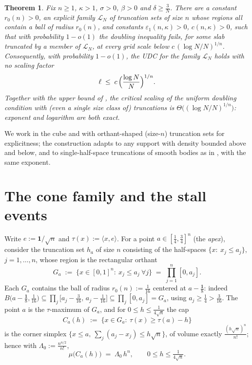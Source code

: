 \documentclass[11pt]{article}
\newtheorem{theorem}{Theorem}[section]
\begin{document}
\begin{theorem}\label{thm:main}
Fix $n\ge1$, $\kappa>1$, $\sigma>0$, $\beta>0$ and $\delta\ge\frac3N$.  There
are a constant $r_0(n)>0$, an explicit family
$\mathcal L_N$ of truncation sets of size $n$ whose regions all contain a ball
of radius $r_0(n)$, and constants
$\varepsilon_1(n,\kappa)>0$, $c(n,\kappa)>0$, such that with probability
$1-o(1)$ the doubling inequality fails, for some slab truncated by a member of
$\mathcal L_N$, at every grid scale below
$c\,(\log N/N)^{1/n}$.  Consequently, with probability $1-o(1)$, the UDC for
the family $\mathcal L_N$ holds with no scaling factor
\[
\ell\;\le\;c\,\Bigl(\frac{\log N}{N}\Bigr)^{1/n} .
\]
Together with the upper bound of \cite{companion2}, the critical scaling of
the uniform doubling condition with (even a single size class of) truncations
is $\Theta\bigl((\log N/N)^{1/n}\bigr)$: exponent and logarithm are both
exact.
\end{theorem}

We work in the cube and with orthant-shaped (size-$n$) truncation sets for
explicitness; the construction adapts to any support with density bounded
above and below, and to single-half-space truncations of smooth bodies as in
\cite{companion4}, with the same exponent.

\section{The cone family and the stall events}\label{sec:cones}

Write $e:=\mathbf 1/\sqrt n$ and $\tau(x):=\langle x,e\rangle$.  For a point
$a\in[\tfrac14,\tfrac34]^n$ (the \emph{apex}), consider the truncation set
$h_a$ of size $n$ consisting of the half-spaces
$\{x:\ x_j\le a_j\}$, $j=1,\dots,n$, whose region is the rectangular orthant
\[
G_a\;:=\;\bigl\{x\in[0,1]^n:\ x_j\le a_j\ \forall j\bigr\}
\;=\;\prod_{j=1}^n[0,a_j] .
\]
Each $G_a$ contains the ball of radius $r_0(n):=\frac1{16}$ centered at
$a-\frac{\mathbf 1}{8}$: indeed
$B\bigl(a-\tfrac{\mathbf1}8,\tfrac1{16}\bigr)\subseteq
\prod_j\bigl[a_j-\tfrac3{16},\,a_j-\tfrac1{16}\bigr]\subseteq\prod_j[0,a_j]=G_a$,
using $a_j\ge\tfrac14>\tfrac3{16}$.  The point $a$ is the $\tau$-maximum of $G_a$,
and for $0\le h\le\tfrac1{4\sqrt n}$ the cap
\[
C_a(h)\;:=\;\bigl\{x\in G_a:\ \tau(x)\ge\tau(a)-h\bigr\}
\]
is the corner simplex $\{x\le a,\ \sum_j(a_j-x_j)\le h\sqrt n\}$, of volume
exactly $\frac{(h\sqrt n)^n}{n!}$; hence with
$\Lambda_0:=\frac{n^{n/2}}{n!}$,
\begin{equation}\label{eq:capmass}
\mu\bigl(C_a(h)\bigr)\;=\;\Lambda_0\,h^n,
\qquad 0\le h\le\tfrac1{4\sqrt n} .
\end{equation}
\end{document}
